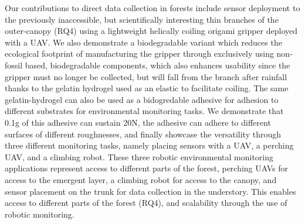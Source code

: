 
Our contributions to direct data collection in forests include  sensor deployment to the previously inaccessible, but scientifically interesting thin branches of the outer-canopy (RQ4) using a lightweight helically coiling origami gripper deployed with a UAV. We also demonstrate a biodegradable variant which reduces the ecological footprint of manufacturing the gripper through exclusively using non-fossil based, biodegradable components, which also enhances usability since the gripper must no longer be collected, but will fall from the branch after rainfall thanks to the gelatin hydrogel used as an elastic to facilitate coiling.
The same gelatin-hydrogel can also be used as a bidogredable adhesive for adhesion to different substrates for environmental monitoring tasks. We demonstrate that 0.1g of this adhesive can sustain 20N, the adhesive can adhere to different surfaces of different roughnesses, and finally showcase the versatility through three different monitoring tasks, namely placing sensors with a UAV, a perching UAV, and a climbing robot. These three robotic environmental monitoring applications represent access to different parts of the forest, perching UAVs for access to the emergent layer, a climbing robot for access to the canopy, and sensor placement on the trunk for data collection in the understory. This enables access to different parts of the forest (RQ4), and scalability through the use of robotic monitoring.


